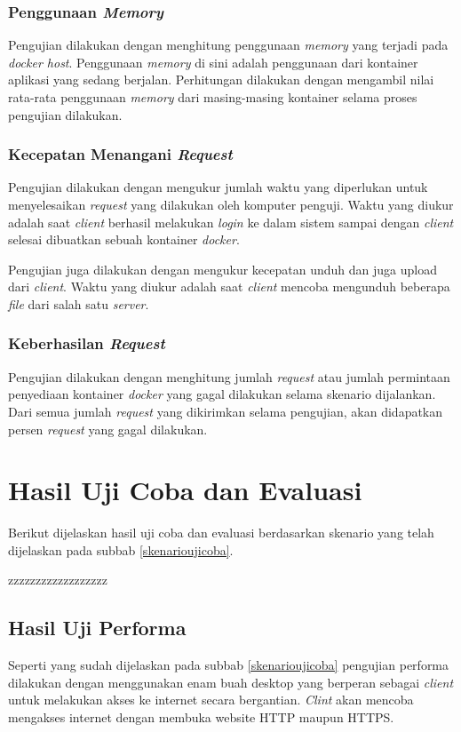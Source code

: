 \subsubsection{Penggunaan \textit{Memory}}
Pengujian dilakukan dengan menghitung penggunaan \textit{memory} yang terjadi pada \textit{docker host}. Penggunaan \textit{memory} di sini adalah penggunaan dari kontainer aplikasi yang sedang berjalan. Perhitungan dilakukan dengan mengambil nilai rata-rata penggunaan \textit{memory} dari masing-masing kontainer selama proses pengujian dilakukan.

\subsubsection{Kecepatan Menangani \textit{Request}}
Pengujian dilakukan dengan mengukur jumlah waktu yang diperlukan untuk menyelesaikan \textit{request} yang dilakukan oleh komputer penguji. Waktu yang diukur adalah saat \textit{client} berhasil melakukan \textit{login} ke dalam sistem sampai dengan \textit{client} selesai dibuatkan sebuah kontainer \textit{docker}.

Pengujian juga dilakukan dengan mengukur kecepatan unduh dan juga upload dari \textit{client}. Waktu yang diukur adalah saat \textit{client} mencoba mengunduh beberapa \textit{file} dari salah satu \textit{server}.

\subsubsection{Keberhasilan \textit{Request}}
Pengujian dilakukan dengan menghitung jumlah \textit{request} atau jumlah permintaan penyediaan kontainer \textit{docker} yang gagal dilakukan selama skenario dijalankan. Dari semua jumlah \textit{request} yang dikirimkan selama pengujian, akan didapatkan persen \textit{request} yang gagal dilakukan.

\section{Hasil Uji Coba dan Evaluasi}
Berikut dijelaskan hasil uji coba dan evaluasi berdasarkan skenario yang telah dijelaskan pada subbab \ref{skenarioujicoba}.

zzzzzzzzzzzzzzzzzz

\subsection{Hasil Uji Performa}
Seperti yang sudah dijelaskan pada subbab \ref{skenarioujicoba} pengujian performa dilakukan dengan menggunakan enam buah desktop yang berperan sebagai \textit{client} untuk melakukan akses ke internet secara bergantian. \textit{Clint} akan mencoba mengakses internet dengan membuka website HTTP maupun HTTPS.

